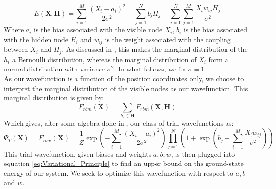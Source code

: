 \documentclass[a4paper, 10pt]{article}
\begin{document}
	\begin{equation}
	E(\mathbf{X}, \mathbf{H})=\sum_{i=1}^{M}\frac{\left(X_i-a_i\right)^2}{2\sigma^2}-\sum_{j=1}^N b_j H_j -\sum_{i=1}^{N}\sum_{j=1}^{M}\frac{X_iw_{ij}H_j}{\sigma^2}
	\end{equation}
	Where $a_i$ is the bias associated with the visible node $X_i$, $b_i$ is the bias associated with the hidden node $H_i$ and $w_{ij}$ is the weight associated with the coupling between $X_i$ and $H_j$. As discussed in \cite{Wang2014}, this makes the marginal distribution of the $h_i$ a Bernoulli distribution, whereas the marginal distribution of $X_i$ form a normal distribution with variance $\sigma^2$. In what follows, we fix $\sigma=1$.\\
	\linebreak
	As our wavefunction is a function of the position coordinates only, we choose to interpret the marginal distribution of the visible nodes as our wavefunction. This marginal distribution is given by:
	\begin{equation}
	F_{rbm}(\mathbf{X})=\sum_{h_i \in \mathbf{H}}F_{rbm}(\mathbf{X}, \mathbf{H})
	\end{equation}
	Which gives, after some algebra done in \cite{Hjorth-Jensen2018}, our class of trial wavefunctions as:
	\begin{equation}\label{eq:Wavefunction}
	\Psi_T(\mathbf{X})=F_{rbm}(\mathbf{X})=\frac{1}{Z}\exp \left(-\sum_{i=1}^M \frac{(X_i-a_i)^2}{2\sigma^2}\right)\prod_{j=1}^{N}\left(1+\exp\left(b_j+\sum_{i=1}^M \frac{X_iw_{ij}}{\sigma^2} \right)\right)
	\end{equation}
	This trial wavefunction, given biases and weights $a,b,w$, is then plugged into equation \ref{eq:Variational_Principle} to find an upper bound on the ground-state energy of our system. We seek to optimize this wavefunction with respect to $a,b$ and $w$.
\end{document}
